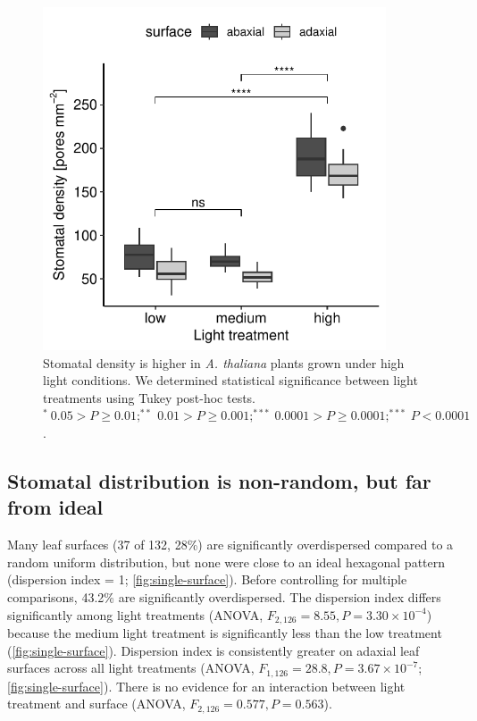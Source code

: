 \documentclass[webpdf,large,modern,unnumsec,namedate]{oup-authoring-template}
\begin{document}
\begin{figure}[ht]
\includegraphics[width = 4in]{figures/density.pdf}
\caption{Stomatal density is higher in \textit{A. thaliana} plants grown under high light conditions. We determined statistical significance between light treatments using Tukey post-hoc tests. $^*~0.05 > P \ge 0.01; ^{**}~0.01 > P \ge 0.001; ^{***}~0.0001 > P \ge 0.0001; ^{***}~ P <0.0001$.}
\label{fig:density}
\end{figure}

\hypertarget{stomatal-distribution-is-non-random-but-far-from-ideal}{%
\subsection{Stomatal distribution is non-random, but far from
ideal}\label{stomatal-distribution-is-non-random-but-far-from-ideal}}

Many leaf surfaces (37 of 132, 28\%) are significantly overdispersed
compared to a random uniform distribution, but none were close to an
ideal hexagonal pattern (dispersion index = 1;
\autoref{fig:single-surface}). Before controlling for multiple
comparisons, 43.2\% are significantly overdispersed. The dispersion
index differs significantly among light treatments (ANOVA,
\(F_{2,126} = 8.55, P = 3.30 \times 10^{-4}\)) because the medium light
treatment is significantly less than the low treatment
(\autoref{fig:single-surface}). Dispersion index is consistently greater
on adaxial leaf surfaces across all light treatments (ANOVA,
\(F_{1,126} = 28.8, P = 3.67 \times 10^{-7}\);
\autoref{fig:single-surface}). There is no evidence for an interaction
between light treatment and surface (ANOVA,
\(F_{2,126} = 0.577, P = 0.563\)).
\end{document}
